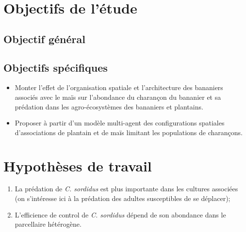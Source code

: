 \section{Objectifs de l'étude}
\subsection{Objectif général}
\subsection{Objectifs spécifiques}
\begin{itemize}
	[label=$\bullet$, leftmargin=1cm, parsep=0cm, itemsep=0cm, topsep=0cm ]
	\item Monter l’effet de l’organisation spatiale et l’architecture des bananiers associés avec le maïs sur l’abondance du charançon du bananier et sa prédation dans les agro-écosystèmes des bananiers et plantains.
	\item Proposer à partir d'un modèle multi-agent des configurations spatiales d'associations de plantain et de maïs limitant les populations de charançons.
\end{itemize}

\section{Hypothèses de travail}
\begin{enumerate}[{H} 1 :]
	\item La prédation de \textit{C. sordidus} est plus importante dans les cultures associées (on s’intéresse ici à la prédation des adultes susceptibles de se déplacer);
	\item L’efficience de control de \textit{C. sordidus} dépend de son abondance dans le parcellaire hétérogène.
	
\end{enumerate}


